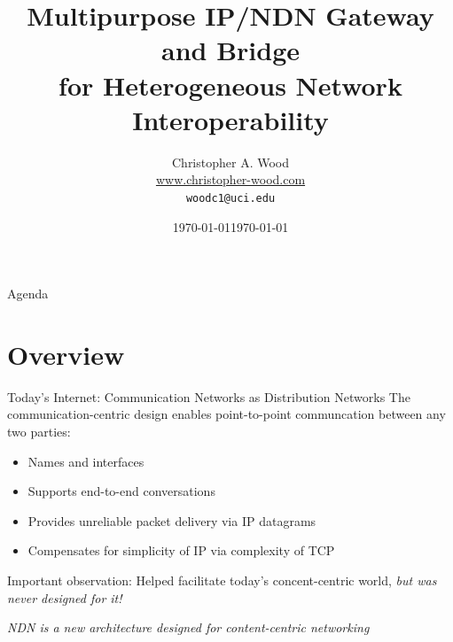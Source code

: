 \documentclass[handout]{beamer}
\title[NDN Gateway]{Multipurpose IP/NDN Gateway and Bridge \\ for Heterogeneous Network Interoperability}
\institute[Donald Bren School of Information and Computer Sciences \\ UC Irvine]{}
\date{\today}
\author[Christopher A. Wood]{Christopher A. Wood \\ \url{www.christopher-wood.com} \\ {\tt woodc1@uci.edu}}
\date{\today}
\begin{document}

\begin{frame}
	\titlepage
\end{frame}

\begin{frame}{Agenda}
	\tableofcontents
\end{frame}


\section{Overview}
\begin{frame}{Today's Internet: Communication Networks as Distribution Networks}
	The communication-centric design enables point-to-point communcation between any two parties:
	\begin{itemize}
		\item Names and interfaces
		\item Supports end-to-end conversations
		\item Provides unreliable packet delivery via IP datagrams
		\item Compensates for simplicity of IP via complexity of TCP
	\end{itemize}

	Important observation: Helped facilitate today's concent-centric world, \emph{but was never designed for it!}

	\medskip

	\emph{NDN is a new architecture designed for content-centric networking}
\end{frame}

\end{document}
